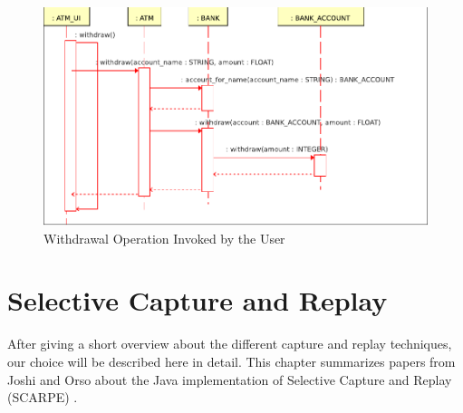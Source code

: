 \begin{figure}[ht]
   \centering
   \includegraphics[width=1\textwidth]{illustrations/example_withdrawal}
   \caption{Withdrawal Operation Invoked by the User}
   \label{fig:example_class_diagram}
\end{figure}

\section{Selective Capture and Replay}
After giving a short overview about the different capture and replay techniques, our choice will be described here in detail. This chapter summarizes papers from Joshi and Orso about the Java implementation of Selective Capture and Replay (SCARPE) \cite{orso05may, orso06}.

